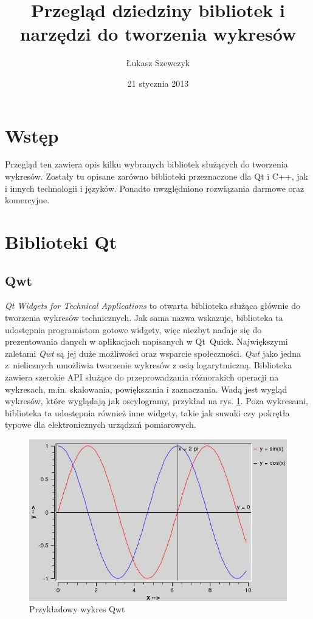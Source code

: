 \documentclass[11pt,twoside,a4paper,final]{llncs}
\begin{document}
\date{21 stycznia 2013}
\title{Przegląd dziedziny bibliotek i narzędzi do tworzenia wykresów}

\author{Łukasz Szewczyk}
\maketitle


\section{Wstęp}
Przegląd ten zawiera opis kilku wybranych bibliotek służących do tworzenia wykresów. Zostały tu opisane zarówno biblioteki przeznaczone dla Qt i C++, jak i innych technologii i języków. Ponadto uwzględniono rozwiązania darmowe oraz komercyjne.

\section{Biblioteki Qt} 
\subsection{Qwt}
\textit{Qt Widgets for Technical Applications} to otwarta biblioteka służąca głównie do tworzenia  wykresów technicznych. Jak sama nazwa wskazuje, biblioteka ta udostępnia programistom gotowe widgety, więc niezbyt nadaje się do prezentowania danych w aplikacjach napisanych w Qt~Quick. Największymi zaletami \textit{Qwt} są jej duże możliwości oraz wsparcie społeczności. \textit{Qwt} jako jedna z~nielicznych umożliwia tworzenie wykresów z osią logarytmiczną. Biblioteka zawiera szerokie API służące do przeprowadzania różnorakich operacji na wykresach, m.in. skalowania, powiększania i zaznaczania. Wadą jest wygląd wykresów, które wyglądają jak oscylogramy, przykład na rys. \ref{rys:wykres:sinus}. Poza wykresami, biblioteka ta udostępnia również inne widgety, takie jak suwaki czy pokrętła typowe dla elektronicznych urządzań pomiarowych.
\begin{figure}
\centering
\caption{Przykładowy wykres Qwt}\label{rys:wykres:sinus}
\includegraphics[scale=0.4]{sinus.png}
\end{figure}
\end{document}
